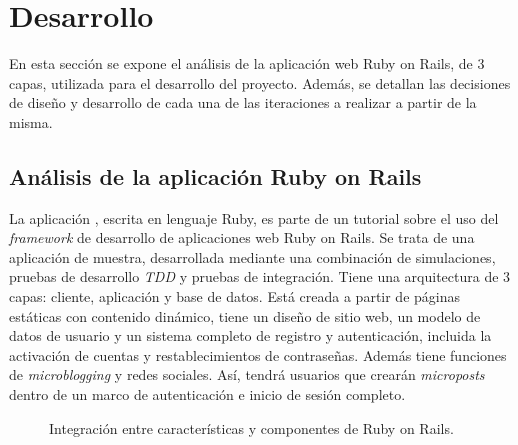 \chapter{Desarrollo}
\label{cha:regulation}

En esta sección se expone el análisis de la aplicación web Ruby on Rails, de 3 capas, utilizada para el desarrollo del proyecto. Además, se detallan las decisiones de diseño y desarrollo de cada una de las iteraciones a realizar a partir de la misma.

\section{Análisis de la aplicación Ruby on Rails}

La aplicación , escrita en lenguaje Ruby, es parte de un tutorial sobre el uso del \textit{framework} de desarrollo de aplicaciones web Ruby on Rails. Se trata de una aplicación de muestra, desarrollada mediante una combinación de simulaciones, pruebas de desarrollo \textit{TDD} y pruebas de integración. Tiene una arquitectura de 3 capas: cliente, aplicación y base de datos. Está creada a partir de páginas estáticas con contenido dinámico, tiene un diseño de sitio web, un modelo de datos de usuario y un sistema completo de registro y autenticación, incluida la activación de cuentas y restablecimientos de contraseñas. Además tiene funciones de \textit{microblogging} y redes sociales. Así, tendrá usuarios que crearán \textit{microposts} dentro de un marco de autenticación e inicio de sesión completo.

\begin{figure}[H]
\caption{Integración entre características y componentes de Ruby on Rails.\label{fig:figure_placement_example}}
\end{figure}

